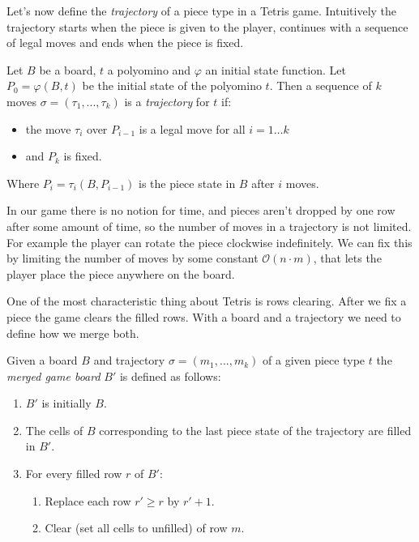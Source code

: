 \vspace{10px}
Let's now define the \emph{trajectory} of a piece type in a Tetris game. Intuitively the trajectory starts when the piece is given to the player, continues with a sequence of legal moves and ends when the piece is fixed. 

\begin{definition} 
  Let $B$ be a board, $t$ a polyomino and $\varphi$ an initial state function. Let $P_0 = \varphi(B,t)$ be the initial state of the polyomino $t$. Then a sequence of $k$ moves $\sigma = (\tau_1, ..., \tau_k)$ is a \emph{trajectory} for $t$ if:

 \begin{itemize}
   \item the move $\tau_{i}$ over $P_{i-1}$ is a legal move for all $i = 1 \dots k$
  \item and $P_k$ is fixed.
 \end{itemize}
 
 Where $P_{i} = \tau_{i}(B,P_{i-1})$ is the piece state in $B$ after $i$ moves.
\end{definition}

In our game there is no notion for time, and pieces aren't dropped by one row after some amount of time, so the number of moves in a trajectory is not limited. For example the player can rotate the piece clockwise indefinitely. We can fix this by limiting the number of moves by some constant $\mathcal{O}(n \cdot m)$, that lets the player place the piece anywhere on the board.

One of the most characteristic thing about Tetris is rows clearing. After we fix a piece the game clears the filled rows. With a board and a trajectory we need to define how we merge both. 

\begin{definition} 
  Given a board $B$ and trajectory $\sigma = (m_1, ..., m_k)$ of a given piece type $t$ the \emph{merged game board} $B'$ is defined as follows:
  \begin{enumerate}
    \item $B'$ is initially $B$.
    \item The cells of $B$ corresponding to the last piece state of the trajectory are filled in $B'$.
    \item For every filled row $r$ of $B'$:
      \begin{enumerate}
        \item Replace each row $r' \geq r$ by $r'+1$.
        \item Clear (set all cells to unfilled) of row $m$.
      \end{enumerate}
  \end{enumerate}
\end{definition}

